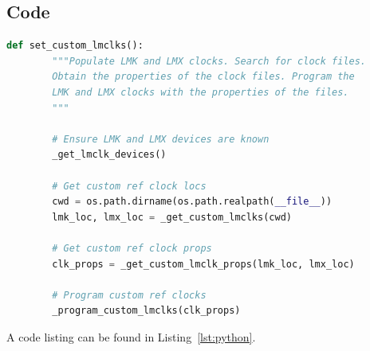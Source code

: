 \subsection{Code}\label{subsec:code}

\begin{lstlisting}[language=Python, caption={The preprocessing step}, label=lst:python]
    def set_custom_lmclks():
        """Populate LMK and LMX clocks. Search for clock files.
        Obtain the properties of the clock files. Program the
        LMK and LMX clocks with the properties of the files.
        """
        
        # Ensure LMK and LMX devices are known
        _get_lmclk_devices()
        
        # Get custom ref clock locs
        cwd = os.path.dirname(os.path.realpath(__file__))
        lmk_loc, lmx_loc = _get_custom_lmclks(cwd)
        
        # Get custom ref clock props
        clk_props = _get_custom_lmclk_props(lmk_loc, lmx_loc)
        
        # Program custom ref clocks
        _program_custom_lmclks(clk_props)
\end{lstlisting}

A code listing can be found in Listing~\ref{lst:python}.
